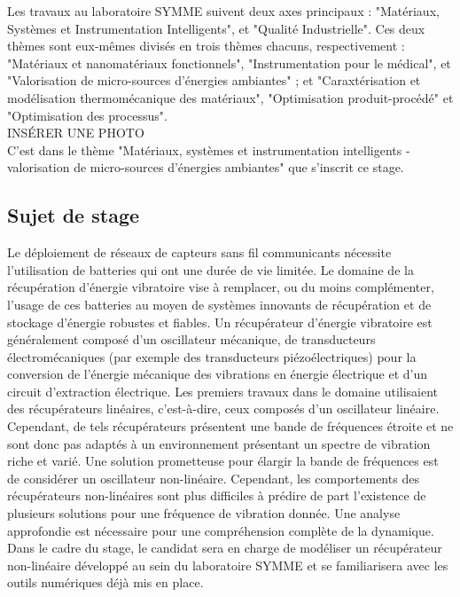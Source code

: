 \documentclass[a4paper, french, 12pt, titlepage]{report}
\begin{document}
Les travaux au laboratoire SYMME suivent deux axes principaux : "Matériaux, Systèmes et Instrumentation Intelligents", et "Qualité Industrielle". Ces deux thèmes sont eux-mêmes divisés en trois thèmes chacuns, respectivement : "Matériaux et nanomatériaux fonctionnels", "Instrumentation pour le médical", et "Valorisation de micro-sources d'énergies ambiantes" ; et "Caraxtérisation et modélisation thermomécanique des matériaux", "Optimisation produit-procédé" et "Optimisation des processus". \\

INSÉRER UNE PHOTO\\

C'est dans le thème "Matériaux, systèmes et instrumentation intelligents - valorisation de micro-sources d'énergies ambiantes" que s'inscrit ce stage. 

\subsection{Sujet de stage}
Le déploiement de réseaux de capteurs sans fil communicants nécessite l’utilisation de batteries qui ont une durée de vie limitée. Le domaine de la récupération d’énergie vibratoire vise à remplacer, ou du moins complémenter, l’usage de ces batteries au moyen de systèmes innovants de récupération et de stockage d’énergie robustes et fiables. Un récupérateur d’énergie vibratoire est généralement composé d’un oscillateur mécanique, de transducteurs électromécaniques (par exemple des transducteurs piézoélectriques) pour la conversion de l’énergie mécanique des vibrations en énergie électrique et d’un circuit d’extraction électrique. Les premiers travaux dans le domaine utilisaient des récupérateurs linéaires, c’est-à-dire, ceux composés d’un oscillateur linéaire. Cependant, de tels récupérateurs présentent une bande de fréquences étroite et ne sont donc pas adaptés à un environnement présentant un spectre de vibration riche et varié. Une solution prometteuse pour élargir la bande de fréquences est de considérer un oscillateur non-linéaire. Cependant, les comportements des récupérateurs non-linéaires sont plus difficiles à prédire de part l’existence de plusieurs solutions pour une fréquence de vibration donnée. Une analyse approfondie est nécessaire pour une compréhension complète de la dynamique. Dans le cadre du stage, le candidat sera en charge de modéliser un récupérateur non-linéaire développé au sein du laboratoire SYMME et se familiarisera avec les outils numériques déjà mis en place.
\end{document}
